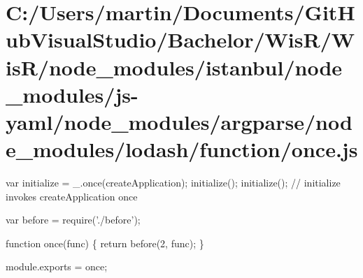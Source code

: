 \hypertarget{_c_1_2_users_2martin_2_documents_2_git_hub_visual_studio_2_bachelor_2_wis_r_2_wis_r_2node_module52992ac669d521b4db389aada4261aaa}{}\section{C\+:/\+Users/martin/\+Documents/\+Git\+Hub\+Visual\+Studio/\+Bachelor/\+Wis\+R/\+Wis\+R/node\+\_\+modules/istanbul/node\+\_\+modules/js-\/yaml/node\+\_\+modules/argparse/node\+\_\+modules/lodash/function/once.\+js}
var initialize = \+\_\+.\+once(create\+Application); initialize(); initialize(); // {\ttfamily initialize} invokes {\ttfamily create\+Application} once


\begin{DoxyCodeInclude}
var before = require(\textcolor{stringliteral}{'./before'});

\textcolor{keyword}{function} once(func) \{
  \textcolor{keywordflow}{return} before(2, func);
\}

module.exports = once;
\end{DoxyCodeInclude}
 